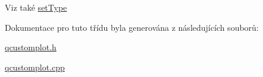 \begin{DoxySeeAlso}{Viz také}
\hyperlink{classQCPItemPosition_aa476abf71ed8fa4c537457ebb1a754ad}{set\+Type} 
\end{DoxySeeAlso}


Dokumentace pro tuto třídu byla generována z následujících souborů\+:\begin{DoxyCompactItemize}
\item 
\hyperlink{qcustomplot_8h}{qcustomplot.\+h}\item 
\hyperlink{qcustomplot_8cpp}{qcustomplot.\+cpp}\end{DoxyCompactItemize}
